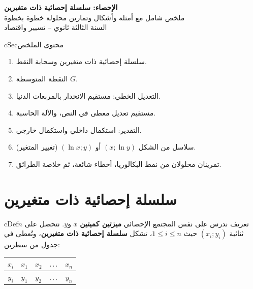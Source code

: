 \documentclass[12pt,a4paper]{article}
\newenvironment{BOX}[2]{\begin{otherlanguage}{english}\begin{arbox}{#1}{#2}}{\end{arbox}\end{otherlanguage}}
\newenvironment{tarif}[1][تعريف]{\begin{BOX}{cDef}{#1}}{\end{BOX}}
\newenvironment{LTR}{\begin{otherlanguage}{english}}{\end{otherlanguage}}
\renewcommand{\ldots}{\mathinner{\ldotp\ldotp\ldotp}}
\begin{document}
\begin{LTR}
\begin{tcolorbox}[enhanced,colback=cSec,colframe=cSec,arc=3mm,halign=center,boxrule=0pt,top=12pt,bottom=12pt,before upper={\selectlanguage{arabic}}]
{\color{white}\fontsize{28}{34}\selectfont\bfseries الإحصاء: سلسلة إحصائية ذات متغيرين}\\[8pt]
{\color{white}\large ملخص شامل مع أمثلة وأشكال وتمارين محلولة خطوة بخطوة}\\[5pt]
{\color{white}\large السنة الثالثة ثانوي -- تسيير واقتصاد}
\end{tcolorbox}
\end{LTR}

\begin{BOX}{cSec}{محتوى الملخص}
\begin{enumerate}[label=\textbf{\arabic*.}]
\item سلسلة إحصائية ذات متغيرين وسحابة النقط.
\item النقطة المتوسطة $G$.
\item التعديل الخطي: مستقيم الانحدار بالمربعات الدنيا.
\item مستقيم تعديل معطى في النص، والآلة الحاسبة.
\item التقدير: استكمال داخلي واستكمال خارجي.
\item سلاسل من الشكل $(x;\ln y)$ أو $(\ln x;y)$ (تغيير المتغير).
\item تمرينان محلولان من نمط البكالوريا، أخطاء شائعة، ثم خلاصة الطرائق.
\end{enumerate}
\end{BOX}
\section{سلسلة إحصائية ذات متغيرين}
\begin{tarif}
ندرس على نفس المجتمع الإحصائي \textbf{ميزتين كميتين} $x$ و$y$. نتحصل على $n$ ثنائية $(x_i;y_i)$ حيث $1\le i\le n$، تشكل \textbf{سلسلة إحصائية ذات متغيرين}، وتُعطى في جدول من سطرين:
\begin{center}
\begin{tabular}{|C|c|c|c|c|}\hline
{} $x_i$ & $x_1$ & $x_2$ & $\ldots$ & $x_n$\\\hline
$y_i$ & $y_1$ & $y_2$ & $\ldots$ & $y_n$\\\hline
\end{tabular}
\end{center}
\end{tarif}
\end{document}

